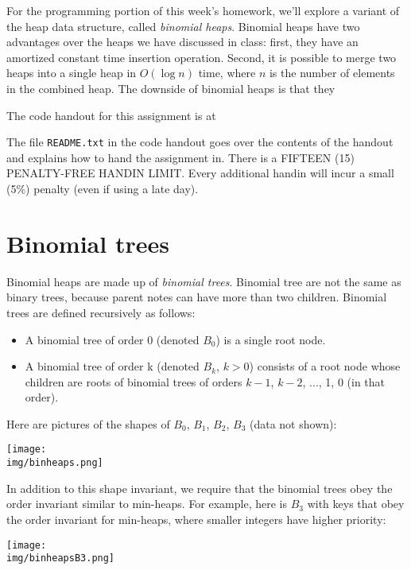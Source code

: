 \documentclass[12pt]{exam}
\begin{document}
\hwTitle

\noindent
For the programming portion of this week's homework, we'll explore a
variant of the heap data structure, called \emph{binomial
  heaps}. Binomial heaps have two advantages over the heaps we have
discussed in class: first, they have an amortized constant time
insertion operation. Second, it is possible to merge two heaps into a
single heap in $O(\log n)$ time, where $n$ is the number of elements
in the combined heap. The downside of binomial heaps is that they

\bigskip
\noindent
The code handout for this assignment is at
\begin{center}
\end{center}
The file \lstinline'README.txt' in the code handout goes over the contents
of the handout and explains how to hand the assignment in.
There is a FIFTEEN (15) PENALTY-FREE HANDIN LIMIT.
Every additional handin will incur a small (5\%) penalty (even if
using a late day).

\newpage
\section{Binomial trees}

Binomial heaps are made up of \emph{binomial trees}.  Binomial tree
are not the same as binary trees, because parent notes can have more
than two children. Binomial trees are defined recursively as follows:

\begin{itemize}
\item%
  A binomial tree of order 0 (denoted $B_0$) is a single root node.
\item%
  A binomial tree of order k (denoted $B_k$, $k > 0$) consists of a
  root node whose children are roots of binomial trees of orders
  $k-1$, $k-2$, ..., 1, 0 (in that order).
\end{itemize}
Here are pictures of the shapes of $B_0$, $B_1$, $B_2$, $B_3$ (data
not shown):
\begin{center}
\texttt{[image: \\img/binheaps.png]}
\end{center}

In addition to this shape invariant, we require that the binomial
trees obey the order invariant similar to min-heaps. For example, here
is $B_3$ with keys that obey the order invariant for min-heaps, where
smaller integers have higher priority:
\begin{center}
\texttt{[image: \\img/binheapsB3.png]}
\end{center}
\end{document}
